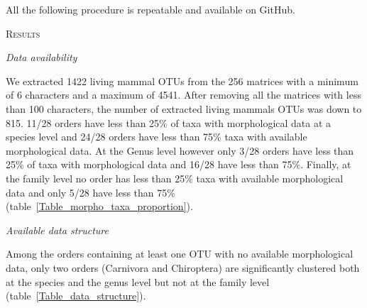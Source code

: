 \documentclass[12pt,letterpaper]{article}
\renewcommand{\section}[1]{%
\bigskip
\begin{center}
\begin{Large}
\normalfont\scshape #1
\medskip
\end{Large}
\end{center}}
\renewcommand{\subsection}[1]{%
\bigskip
\begin{center}
\begin{large}
\normalfont\itshape #1
\end{large}
\end{center}}
\renewcommand{\subsubsection}[1]{%
\vspace{2ex}
\noindent
\textit{#1.}---}
\begin{document}

All the following procedure is repeatable and available on GitHub. %

%
%

\section{Results}

\subsection{Data availability}
We extracted 1422 living mammal OTUs from the 256 matrices with a minimum of 6 characters and a maximum of 4541. After removing all the matrices with less than 100 characters, the number of extracted living mammals OTUs was down to 815. 11/28 orders have less than 25\% of taxa with morphological data at a species level and 24/28 orders have less than 75\% taxa with available morphological data. At the Genus level however only 3/28 orders have less than 25\% of taxa with morphological data and 16/28 have less than 75\%. Finally, at the family level no order has less than 25\% taxa with available morphological data and only 5/28 have less than 75\% (table~\ref{Table_morpho_taxa_proportion}).

\renewcommand\baselinestretch{1.2}\selectfont
\begin{center}

\end{center}
\renewcommand\baselinestretch{2}\selectfont

\subsection{Available data structure}
Among the orders containing at least one OTU with no available morphological data, only two orders (Carnivora and Chiroptera) are significantly clustered both at the species and the genus level but not at the family level (table~\ref{Table_data_structure}).
\renewcommand\baselinestretch{1.2}\selectfont
\begin{center}

\end{center}
\renewcommand\baselinestretch{2}\selectfont
\end{document}
